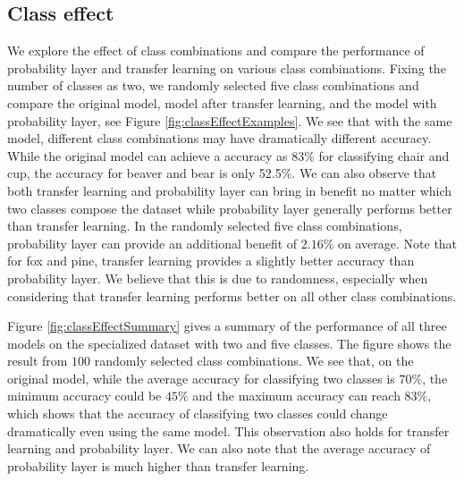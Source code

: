 \documentclass[pageno]{jpaper}
\begin{document}
\subsection{Class effect}
We explore the effect of class combinations and compare the performance of probability layer and transfer learning on various class combinations. Fixing the number of classes as two, we randomly selected five class combinations and compare the original model, model after transfer learning, and the model with probability layer, see Figure \ref{fig:classEffectExamples}. We see that with the same model, different class combinations may have dramatically different accuracy. While the original model can achieve a accuracy as 83\% for classifying chair and cup, the accuracy for beaver and bear is only 52.5\%. We can also observe that both transfer learning and probability layer can bring in benefit no matter which two classes compose the dataset while probability layer generally performs better than transfer learning. In the randomly selected five class combinations, probability layer can provide an additional benefit of $2.16\%$ on average. Note that for fox and pine, transfer learning provides a slightly better accuracy than probability layer. We believe that this is due to randomness, especially when considering that transfer learning performs better on all other class combinations. 

Figure \ref{fig:classEffectSummary} gives a summary of the performance of all three models on the specialized dataset with two and five classes. The figure shows the result from $100$ randomly selected class combinations. We see that, on the original model, while the average accuracy for classifying two classes is $70\%$, the minimum accuracy could be $45\%$ and the maximum accuracy can reach $83\%$, which shows that the accuracy of classifying two classes could change dramatically even using the same model. This observation also holds for transfer learning and probability layer. We can also note that the average accuracy of probability layer is much higher than transfer learning. 
\end{document}
